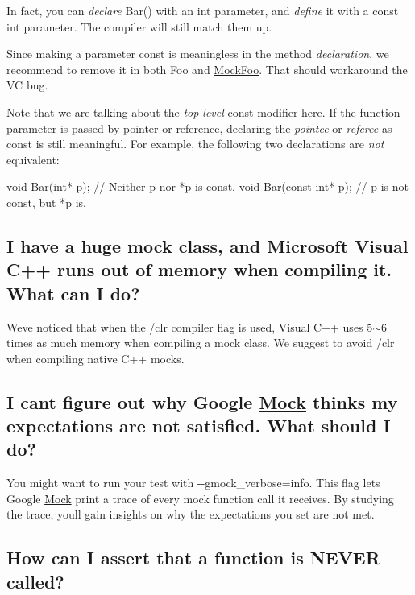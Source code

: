 In fact, you can {\itshape declare} Bar() with an {\ttfamily int} parameter, and {\itshape define} it with a {\ttfamily const int} parameter. The compiler will still match them up.

Since making a parameter {\ttfamily const} is meaningless in the method {\itshape declaration}, we recommend to remove it in both {\ttfamily Foo} and {\ttfamily \hyperlink{class_mock_foo}{Mock\+Foo}}. That should workaround the VC bug.

Note that we are talking about the {\itshape top-\/level} {\ttfamily const} modifier here. If the function parameter is passed by pointer or reference, declaring the {\itshape pointee} or {\itshape referee} as {\ttfamily const} is still meaningful. For example, the following two declarations are {\itshape not} equivalent\+: 
\begin{DoxyCode}
void Bar(int* p);        // Neither p nor *p is const.
void Bar(const int* p);  // p is not const, but *p is.
\end{DoxyCode}


\subsection*{I have a huge mock class, and Microsoft Visual C++ runs out of memory when compiling it. What can I do?}

We\textquotesingle{}ve noticed that when the {\ttfamily /clr} compiler flag is used, Visual C++ uses 5$\sim$6 times as much memory when compiling a mock class. We suggest to avoid {\ttfamily /clr} when compiling native C++ mocks.

\subsection*{I can\textquotesingle{}t figure out why Google \hyperlink{class_mock}{Mock} thinks my expectations are not satisfied. What should I do?}

You might want to run your test with {\ttfamily -\/-\/gmock\+\_\+verbose=info}. This flag lets Google \hyperlink{class_mock}{Mock} print a trace of every mock function call it receives. By studying the trace, you\textquotesingle{}ll gain insights on why the expectations you set are not met.

\subsection*{How can I assert that a function is N\+E\+V\+ER called?}


